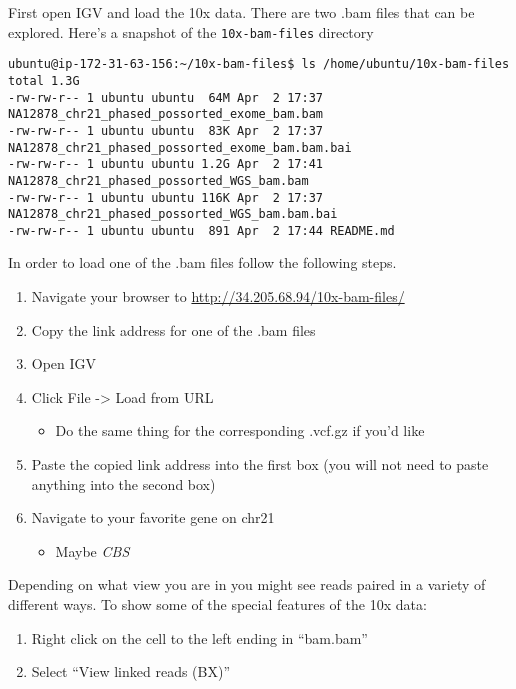 \documentclass[]{article}
\providecommand{\tightlist}{%
  \setlength{\itemsep}{0pt}\setlength{\parskip}{0pt}}
\begin{document}
First open IGV and load the 10x data. There are two .bam files that can
be explored. Here's a snapshot of the \texttt{10x-bam-files} directory

\begin{verbatim}
ubuntu@ip-172-31-63-156:~/10x-bam-files$ ls /home/ubuntu/10x-bam-files
total 1.3G
-rw-rw-r-- 1 ubuntu ubuntu  64M Apr  2 17:37 NA12878_chr21_phased_possorted_exome_bam.bam
-rw-rw-r-- 1 ubuntu ubuntu  83K Apr  2 17:37 NA12878_chr21_phased_possorted_exome_bam.bam.bai
-rw-rw-r-- 1 ubuntu ubuntu 1.2G Apr  2 17:41 NA12878_chr21_phased_possorted_WGS_bam.bam
-rw-rw-r-- 1 ubuntu ubuntu 116K Apr  2 17:37 NA12878_chr21_phased_possorted_WGS_bam.bam.bai
-rw-rw-r-- 1 ubuntu ubuntu  891 Apr  2 17:44 README.md
\end{verbatim}

In order to load one of the .bam files follow the following steps.

\begin{enumerate}
\def\labelenumi{\arabic{enumi}.}
\tightlist
\item
  Navigate your browser to \url{http://34.205.68.94/10x-bam-files/}
\item
  Copy the link address for one of the .bam files
\item
  Open IGV
\item
  Click File -\textgreater{} Load from URL

  \begin{itemize}
  \tightlist
  \item
    Do the same thing for the corresponding .vcf.gz if you'd like
  \end{itemize}
\item
  Paste the copied link address into the first box (you will not need to
  paste anything into the second box)
\item
  Navigate to your favorite gene on chr21

  \begin{itemize}
  \tightlist
  \item
    Maybe \emph{CBS}
  \end{itemize}
\end{enumerate}

Depending on what view you are in you might see reads paired in a
variety of different ways. To show some of the special features of the
10x data:

\begin{enumerate}
\def\labelenumi{\arabic{enumi}.}
\tightlist
\item
  Right click on the cell to the left ending in ``bam.bam''
\item
  Select ``View linked reads (BX)''
\end{enumerate}
\end{document}
